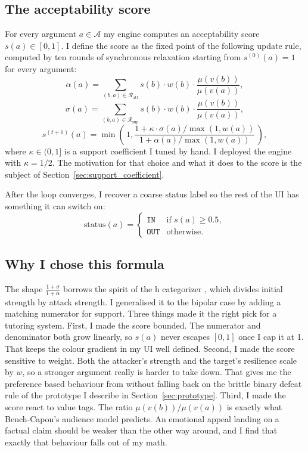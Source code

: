 \subsection{The acceptability score}
\label{sec:score}
For every argument $a \in \mathcal{A}$ my engine computes an acceptability score $s(a) \in [0, 1]$. I define the score as the fixed point of the following update rule, computed by ten rounds of synchronous relaxation starting from $s^{(0)}(a) = 1$ for every argument:
\[
\alpha(a) = \sum_{(b,a) \in \mathcal{R}_{\text{att}}} s(b) \cdot w(b) \cdot \frac{\mu(v(b))}{\mu(v(a))},
\]
\[
\sigma(a) = \sum_{(b,a) \in \mathcal{R}_{\text{sup}}} s(b) \cdot w(b) \cdot \frac{\mu(v(b))}{\mu(v(a))},
\]
\[
s^{(t+1)}(a) = \min\!\left(\, 1, \frac{1 + \kappa \cdot \sigma(a)/\max(1, w(a))}{1 + \alpha(a)/\max(1, w(a))} \,\right),
\]
where $\kappa \in (0, 1]$ is a support coefficient I tuned by hand. I deployed the engine with $\kappa = 1/2$. The motivation for that choice and what it does to the score is the subject of Section~\ref{sec:support_coefficient}.

After the loop converges, I recover a coarse status label so the rest of the UI has something it can switch on:
\[
\text{status}(a) = \begin{cases} \texttt{IN} & \text{if } s(a) \geq 0.5, \\ \texttt{OUT} & \text{otherwise.} \end{cases}
\]

\subsection{Why I chose this formula}
The shape $\frac{1+\sigma}{1+\alpha}$ borrows the spirit of the h categorizer \cite{besnard2001logic}, which divides initial strength by attack strength. I generalised it to the bipolar case by adding a matching numerator for support. Three things made it the right pick for a tutoring system. First, I made the score bounded. The numerator and denominator both grow linearly, so $s(a)$ never escapes $[0, 1]$ once I cap it at 1. That keeps the colour gradient in my UI well defined. Second, I made the score sensitive to weight. Both the attacker's strength and the target's resilience scale by $w$, so a stronger argument really is harder to take down. That gives me the preference based behaviour from \cite{amgoud2002reasoning} without falling back on the brittle binary defeat rule of the prototype I describe in Section~\ref{sec:prototype}. Third, I made the score react to value tags. The ratio $\mu(v(b))/\mu(v(a))$ is exactly what Bench-Capon's audience model \cite{benchcapon2003value} predicts. An emotional appeal landing on a factual claim should be weaker than the other way around, and I find that exactly that behaviour falls out of my math.

